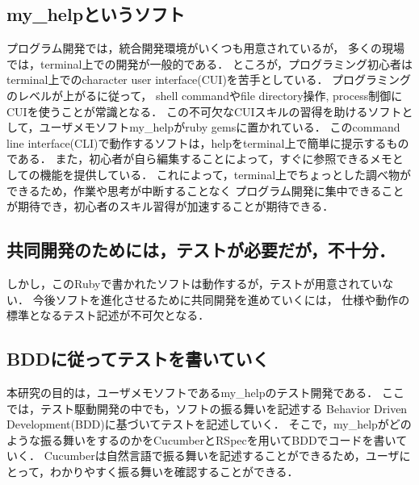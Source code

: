 \subsection{my\_helpというソフト}
プログラム開発では，統合開発環境がいくつも用意されているが，
多くの現場では，terminal上での開発が一般的である．
ところが，プログラミング初心者はterminal上でのcharacter user interface(CUI)を苦手としている．
プログラミングのレベルが上がるに従って，
shell commandやfile directory操作, process制御にCUIを使うことが常識となる．
この不可欠なCUIスキルの習得を助けるソフトとして，ユーザメモソフトmy\_helpがruby gemsに置かれている．
このcommand line interface(CLI)で動作するソフトは，helpをterminal上で簡単に提示するものである．
また，初心者が自ら編集することによって，すぐに参照できるメモとしての機能を提供している．
これによって，terminal上でちょっとした調べ物ができるため，作業や思考が中断することなく
プログラム開発に集中できることが期待でき，初心者のスキル習得が加速することが期待できる．

\subsection{共同開発のためには，テストが必要だが，不十分．}
しかし，このRubyで書かれたソフトは動作するが，テストが用意されていない．
今後ソフトを進化させるために共同開発を進めていくには，
仕様や動作の標準となるテスト記述が不可欠となる．

\subsection{BDDに従ってテストを書いていく}
本研究の目的は，ユーザメモソフトであるmy\_helpのテスト開発である．
ここでは，テスト駆動開発の中でも，ソフトの振る舞いを記述する
Behavior Driven Development(BDD)に基づいてテストを記述していく．
そこで，my\_helpがどのような振る舞いをするのかをCucumberとRSpecを用いてBDDでコードを書いていく．
Cucumberは自然言語で振る舞いを記述することができるため，ユーザにとって，わかりやすく振る舞いを確認することができる．

